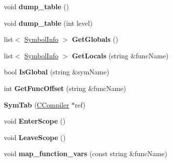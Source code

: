 \begin{DoxyCompactItemize}
\item 
\hypertarget{classSymTab_ab4c005eb114053be22fdbe315542f55b}{void {\bfseries dump\-\_\-table} ()}\label{classSymTab_ab4c005eb114053be22fdbe315542f55b}

\item 
\hypertarget{classSymTab_ad5d45136f341bf024a226fe600fb4dcc}{void {\bfseries dump\-\_\-table} (int level)}\label{classSymTab_ad5d45136f341bf024a226fe600fb4dcc}

\item 
\hypertarget{classSymTab_aced837e720830dd9ccb2d3dde621d489}{list$<$ \hyperlink{structSymbolInfo}{Symbol\-Info} $>$ {\bfseries Get\-Globals} ()}\label{classSymTab_aced837e720830dd9ccb2d3dde621d489}

\item 
\hypertarget{classSymTab_a76b5a70170535019b1fe58fa25a9998c}{list$<$ \hyperlink{structSymbolInfo}{Symbol\-Info} $>$ {\bfseries Get\-Locals} (string \&func\-Name)}\label{classSymTab_a76b5a70170535019b1fe58fa25a9998c}

\item 
\hypertarget{classSymTab_a4c4699d90ffd605b205e9e94be9eacde}{bool {\bfseries Is\-Global} (string \&sym\-Name)}\label{classSymTab_a4c4699d90ffd605b205e9e94be9eacde}

\item 
\hypertarget{classSymTab_a793c31d247f484b04a9283e71f172756}{int {\bfseries Get\-Func\-Offset} (string \&func\-Name)}\label{classSymTab_a793c31d247f484b04a9283e71f172756}

\item 
\hypertarget{classSymTab_a20c7b65c7ffb728fa792e87258d381a2}{{\bfseries Sym\-Tab} (\hyperlink{classCCompiler}{C\-Compiler} $\ast$ref)}\label{classSymTab_a20c7b65c7ffb728fa792e87258d381a2}

\item 
\hypertarget{classSymTab_af335dd1ba840dfab4219856545d5d8ef}{void {\bfseries Enter\-Scope} ()}\label{classSymTab_af335dd1ba840dfab4219856545d5d8ef}

\item 
\hypertarget{classSymTab_afd2c44208cdad3ddfc85136136cd27c3}{void {\bfseries Leave\-Scope} ()}\label{classSymTab_afd2c44208cdad3ddfc85136136cd27c3}

\item 
\hypertarget{classSymTab_aaca51de0935bbdbf3fdf434deccccb92}{void {\bfseries map\-\_\-function\-\_\-vars} (const string \&func\-Name)}\label{classSymTab_aaca51de0935bbdbf3fdf434deccccb92}


\end{DoxyCompactItemize}
